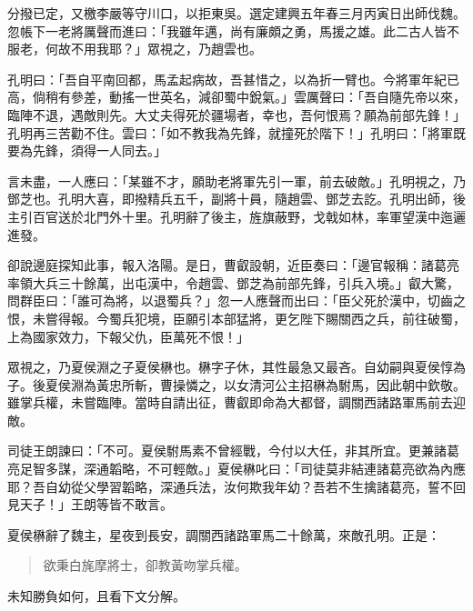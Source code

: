 分撥已定，又檄李嚴等守川口，以拒東吳。選定建興五年春三月丙寅日出師伐魏。忽帳下一老將厲聲而進曰：「我雖年邁，尚有廉頗之勇，馬援之雄。此二古人皆不服老，何故不用我耶？」眾視之，乃趙雲也。

孔明曰：「吾自平南回都，馬孟起病故，吾甚惜之，以為折一臂也。今將軍年紀已高，倘稍有參差，動搖一世英名，減卻蜀中銳氣。」雲厲聲曰：「吾自隨先帝以來，臨陣不退，遇敵則先。大丈夫得死於疆場者，幸也，吾何恨焉？願為前部先鋒！」孔明再三苦勸不住。雲曰：「如不教我為先鋒，就撞死於階下！」孔明曰：「將軍既要為先鋒，須得一人同去。」

言未盡，一人應曰：「某雖不才，願助老將軍先引一軍，前去破敵。」孔明視之，乃鄧芝也。孔明大喜，即撥精兵五千，副將十員，隨趙雲、鄧芝去訖。孔明出師，後主引百官送於北門外十里。孔明辭了後主，旌旗蔽野，戈戟如林，率軍望漢中迤邐進發。

卻說邊庭探知此事，報入洛陽。是日，曹叡設朝，近臣奏曰：「邊官報稱：諸葛亮率領大兵三十餘萬，出屯漢中，令趙雲、鄧芝為前部先鋒，引兵入境。」叡大驚，問群臣曰：「誰可為將，以退蜀兵？」忽一人應聲而出曰：「臣父死於漢中，切齒之恨，未嘗得報。今蜀兵犯境，臣願引本部猛將，更乞陛下賜關西之兵，前往破蜀，上為國家效力，下報父仇，臣萬死不恨！」

眾視之，乃夏侯淵之子夏侯楙也。楙字子休，其性最急又最吝。自幼嗣與夏侯惇為子。後夏侯淵為黃忠所斬，曹操憐之，以女清河公主招楙為駙馬，因此朝中欽敬。雖掌兵權，未嘗臨陣。當時自請出征，曹叡即命為大都督，調關西諸路軍馬前去迎敵。

司徒王朗諫曰：「不可。夏侯駙馬素不曾經戰，今付以大任，非其所宜。更兼諸葛亮足智多謀，深通韜略，不可輕敵。」夏侯楙叱曰：「司徒莫非結連諸葛亮欲為內應耶？吾自幼從父學習韜略，深通兵法，汝何欺我年幼？吾若不生擒諸葛亮，誓不回見天子！」王朗等皆不敢言。

夏侯楙辭了魏主，星夜到長安，調關西諸路軍馬二十餘萬，來敵孔明。正是：

\begin{quote}
欲秉白旄摩將士，卻教黃吻掌兵權。
\end{quote}

未知勝負如何，且看下文分解。
